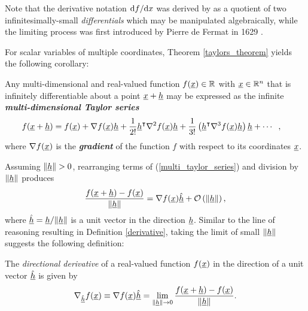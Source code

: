 Note that the derivative notation $\mathrm{d}f / \mathrm{d}x$ was derived by \citet{leibniz_1684} as a quotient of two infinitesimally-small \emph{differentials} which may be manipulated algebraically, while the limiting process was first introduced by Pierre de Fermat in 1629 \citep{stillwell_2010}.

For scalar variables of multiple coordinates, Theorem \ref{taylors_theorem} yields the following corollary:
\begin{corollary}
\label{multi_dimensional_taylors_theorem}
Any multi-dimensional and real-valued function $f(\underline{x}) \in \mathbb{R}$ with $\underline{x} \in \mathbb{R}^n$ that is infinitely differentiable about a point $\underline{x}+\underline{h}$ may be expressed as the infinite \textbf{\emph{multi-dimensional Taylor series}}
{\footnotesize
 \begin{align}
  \label{multi_taylor_series}
  f(\underline{x}+\underline{h}) &= f(\underline{x}) + \nabla f(\underline{x}) \underline{h} + \frac{1}{2!} \underline{h}^\intercal \nabla^2 f(\underline{x}) \underline{h} + \frac{1}{3!} \left( \underline{h}^\intercal \nabla^3 f(\underline{x}) \underline{h} \right) \underline{h} + \cdots \hspace{2mm},
\end{align}}
where $\nabla f(\underline{x})$ is the \textbf{\emph{gradient}} of the function $f$ with respect to its coordinates $\underline{x}$.
\end{corollary}

Assuming $\Vert \underline{h} \Vert >0$, rearranging terms of (\ref{multi_taylor_series}) and division by $\Vert \underline{h} \Vert$ produces
\begin{align}
  \label{intermediate_directional_derivative}
  \frac{ f(\underline{x}+\underline{h}) - f(\underline{x}) }{ \Vert \underline{h} \Vert} = \nabla f(\underline{x}) \hat{\underline{h}} + \mathcal{O}\left( \Vert \underline{h} \Vert \right),
\end{align}
where $\hat{\underline{h}} = \underline{h} / \Vert \underline{h} \Vert$ is a unit vector in the direction $\underline{h}$.
Similar to the line of reasoning resulting in Definition \ref{derivative}, taking the limit of small $\Vert \underline{h} \Vert$ suggests the following definition:
\begin{definition}
\label{directional_derivative}
The \emph{directional derivative} of a real-valued function $f(\underline{x})$ in the direction of a unit vector $\hat{\underline{h}}$ is given by 
\begin{align*}
  \nabla_{\hat{\underline{h}}} f(\underline{x}) \equiv \nabla f(\underline{x}) \hat{\underline{h}} = \lim_{\Vert \underline{h} \Vert \rightarrow 0} \frac{ f(\underline{x}+\underline{h}) - f(\underline{x}) }{ \Vert \underline{h} \Vert}.
\end{align*}
\end{definition}

